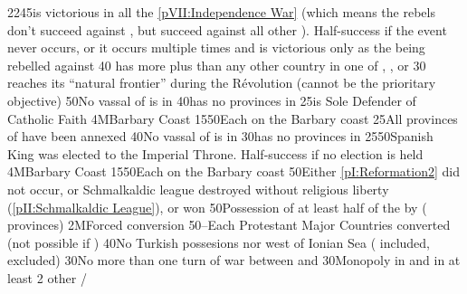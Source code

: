 %
%
{22}{45}{\FRA is victorious in all the \ref{pVII:Independence War} (which
  means the rebels don't succeed against \FRA, but succeed against all other
  \MAJ). Half-success if the event never occurs, or it occurs multiple times
  and \FRA is victorious only as the \MAJ being rebelled against }%
%
%
{}{40}{ has more \TP plus \COL than any other country in
  one of , , or
  }%
%
%
%
{}{30}{ reaches its ``natural frontier'' during the
  Révolution (cannot be the prioritary objective)}%
%
 
%
%
{}{50}{No vassal of \paysmajeurFrance is in \regionItalie}%
%
%
{}{40}{\paysmajeurFrance has no provinces in \regionItalie}%
%
%
{}{25}{\HIS is Sole Defender of Catholic Faith}%
%
\EUobjective4M{Barbary Coast}{\Presidio}%
{15}{50}{Each \Presidio on the Barbary coast}%
%
%
{}{25}{All provinces of \paysprovincesne have been annexed}%
%
%
%
{}{40}{No vassal of \paysmajeurFrance is in \regionItalie}%
%
%
{}{30}{\paysmajeurFrance has no provinces in \regionItalie}%
%
%
{25}{50}{Spanish King was elected to the Imperial Throne. Half-success if no
  election is held}%
%
\EUobjective4M{Barbary Coast}{\Presidio}%
{15}{50}{Each \Presidio on the Barbary coast}%
%
%
{}{50}{Either \ref{pI:Reformation2} did not occur, or Schmalkaldic league
  destroyed without religious liberty (\ref{pII:Schmalkaldic League}),
  or  won}%
%
%
%
{}{50}{Possession of at least half of the \payshongrie by \AUSaus (
  provinces)}%
%
\EUobjective2M{Forced conversion}{\MAJ}%
{50}{--}{Each Protestant Major Countries converted (not possible if \CATHCO)}%
%
%
{}{40}{No Turkish possesions nor \VASSAL west of Ionian Sea
  ( included, \paystripoli excluded)}%
%
%
{}{30}{No more than one turn of war between  and
  }%
%
%
{}{30}{Monopoly in  and in at least 2 other \CTZ/\STZ}%
